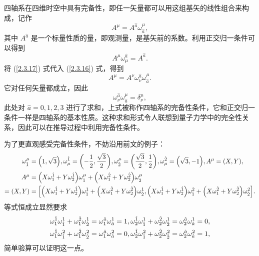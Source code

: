 \documentclass[UTF8, 12pt, a4paper, oneside, onecolumn, fontset=none]{ctexart}
\begin{document}
四轴系在四维时空中具有完备性，即任一矢量都可以用这组基矢的线性组合来构成，记作
\begin{equation}
A^{\mu}=A^{\hat{a}}\omega^{\mu}_{\hat{a}},\label{2.3.16}
\end{equation}
其中 $A^{\hat{a}}$ 是一个标量性质的量，即观测量，是基矢前的系数。利用正交归一条件可以得到
\begin{equation}
A^{\mu}\omega_{\mu}^{\hat{a}}=A^{\hat{a}}.\label{2.3.17}
\end{equation}
将 (\ref{2.3.17}) 式代入 (\ref{2.3.16}) 式，得到
\begin{equation}
A^{\mu}=A^{\nu}\omega_{\nu}^{\hat{a}}\omega_{\hat{a}}^{\mu}.
\end{equation}
它对任何矢量都成立，因此
\begin{equation}
\omega^{\hat{a}}_{\nu}\omega^{\mu}_{\hat{a}}=\delta^{\mu}_{\nu},
\end{equation}
此处对 $\hat{a}=0, 1, 2, 3$ 进行了求和，上式被称作四轴系的完备性条件，它和正交归一条件一样是四轴系的基本性质。这种求和形式令人联想到量子力学中的完全性关系，因此可以在推导过程中利用完备性条件。

为了更直观感受完备性条件，不妨沿用前文的例子：
\begin{align}
\omega^{\mu}_{\hat{1}}&=\mleft(1,\sqrt{3}\mright),\omega_{\mu}^{\hat{1}}=\mleft(-\frac{1}{2},\frac{\sqrt{3}}{2}\mright),\omega^{\mu}_{\hat{2}}=\mleft(\frac{\sqrt{3}}{2},\frac{1}{2}\mright),\omega_{\mu}^{\hat{2}}=\mleft(\sqrt{3},-1\mright), A^{\mu}=\mleft(X, Y\mright),\notag\\
A^{\mu}&=\mleft(X\omega^{\hat{1}}_{1}+Y\omega^{\hat{1}}_{2}\mright)\omega^{\mu}_{\hat{1}}+\mleft(X\omega^{\hat{2}}_{1}+Y\omega^{\hat{2}}_{2}\mright)\omega^{\mu}_{\hat{2}}\notag\\
=\mleft(X, Y\mright)&=\mleft[\mleft(X\omega^{\hat{1}}_{1}+Y\omega^{\hat{1}}_{2}\mright)\omega^{1}_{\hat{1}}+\mleft(X\omega^{\hat{2}}_{1}+Y\omega^{\hat{2}}_{2}\mright)\omega^{1}_{\hat{2}},\mleft(X\omega^{\hat{1}}_{1}+Y\omega^{\hat{1}}_{2}\mright)\omega^{2}_{\hat{1}}+\mleft(X\omega^{\hat{2}}_{1}+Y\omega^{\hat{2}}_{2}\mright)\omega^{2}_{\hat{2}}\mright].\notag
\end{align}
等式恒成立显然要求
\begin{align}
\omega^{\hat{1}}_{1}\omega^{1}_{\hat{1}}+\omega^{\hat{2}}_{1}\omega^{1}_{\hat{2}}=\omega^{\hat{a}}_{1}\omega^{1}_{\hat{a}}=1,\omega^{\hat{1}}_{2}\omega^{1}_{\hat{1}}+\omega^{\hat{2}}_{2}\omega^{1}_{\hat{2}}=\omega^{\hat{a}}_{2}\omega^{1}_{\hat{a}}=0,\notag\\
\omega^{\hat{1}}_{1}\omega^{2}_{\hat{1}}+\omega^{\hat{2}}_{1}\omega^{2}_{\hat{2}}=\omega^{\hat{a}}_{1}\omega^{2}_{\hat{a}}=0,\omega^{\hat{1}}_{2}\omega^{2}_{\hat{1}}+\omega^{\hat{2}}_{2}\omega^{2}_{\hat{2}}=\omega^{\hat{a}}_{2}\omega^{2}_{\hat{a}}=1,\notag
\end{align}
简单验算可以证明这一点。
\end{document}
